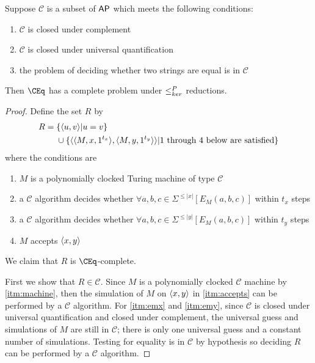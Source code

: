 \begin{theorem}\label{thm:generalcompleteness}
  Suppose $\mathcal{C}$ is a subset of ${\mathsf{AP}}$ which meets the following conditions:
  \begin{enumerate}
  \item $\mathcal{C}$ is closed under complement
  \item $\mathcal{C}$ is closed under universal quantification
  \item the problem of deciding whether two strings are equal is in $\mathcal{C}$
  \end{enumerate}
  Then $\CEq$ has a complete problem under $\leq^{P}_{ker}$ reductions.
\end{theorem}
\begin{proof}
  Define the set $R$ by
  \begin{align*}
    R = {} & \{\langle u,v\rangle|u=v\} \\
    & \cup \{\langle\langle M,x,1^{t_x}\rangle,\langle M,y,1^{t_y}\rangle\rangle |
    \text{1 through 4 below are satisfied}\}
  \end{align*}
  where the conditions are
  \begin{enumerate}
  \item\label{itm:machine} $M$ is a polynomially clocked Turing machine of type $\mathcal{C}$
  \item\label{itm:emx} a $\mathcal{C}$ algorithm decides whether $\forall a,b,c\in\Sigma^{\leq |x|}[E_M(a,b,c)]$ within $t_x$ steps
  \item\label{itm:emy} a $\mathcal{C}$ algorithm decides whether $\forall a,b,c\in\Sigma^{\leq |y|}[E_M(a,b,c)]$ within $t_y$ steps
  \item\label{itm:accepts} $M$ accepts $\langle x,y\rangle$
  \end{enumerate}
  We claim that $R$ is $\CEq$-complete.

  First we show that $R\in\mathcal{C}$.
  Since $M$ is a polynomially clocked $\mathcal{C}$ machine by \autoref{itm:machine}, then the simulation of $M$ on $\langle x,y\rangle$ in \autoref{itm:accepts} can be performed by a $\mathcal{C}$ algorithm.
  For \autoref{itm:emx} and \autoref{itm:emy}, since $\mathcal{C}$ is closed under universal quantification and closed under complement, the universal guess and simulations of $M$ are still in $\mathcal{C}$; there is only one universal guess and a constant number of simulations.
  Testing for equality is in $\mathcal{C}$ by hypothesis so deciding $R$ can be performed by a $\mathcal{C}$ algorithm.


\end{proof}
